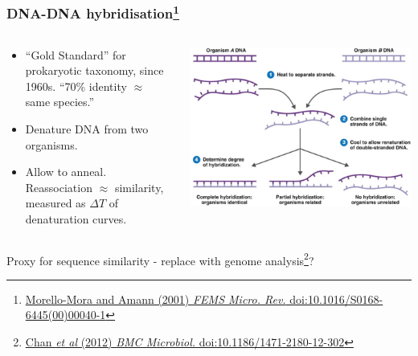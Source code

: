 \begin{frame}
  \frametitle{DNA-DNA hybridisation\footnote{\tiny{\href{http://dx.doi.org/10.1016/S0168-6445(00)00040-1}{Morello-Mora and Amann (2001) \textit{FEMS Micro. Rev.} doi:10.1016/S0168-6445(00)00040-1}}}}
  \begin{columns}[T]
    \begin{column}{5cm}
      \begin{itemize}
        \item ``Gold Standard'' for prokaryotic taxonomy, since 1960s. \textcolor{hutton_green}{``70\% identity $\approx$ same species.''}
        \item Denature DNA from two organisms.
        \item Allow to anneal. \textcolor{hutton_blue}{Reassociation $\approx$ similarity}, measured as $\Delta T$  of denaturation curves.
      \end{itemize}
    \end{column}
    \begin{column}{5cm}
      \includegraphics[width=1\textwidth]{images/dna-dna_hyb}
    \end{column}
  \end{columns}
\vspace{0.25cm}
\textcolor{hutton_purple}{Proxy for sequence similarity - replace with genome analysis\footnote{\tiny{\href{http://dx.doi.org/10.1186/1471-2180-12-302}{Chan \textit{et al} (2012) \textit{BMC Microbiol.} doi:10.1186/1471-2180-12-302}}}}?
\end{frame}

